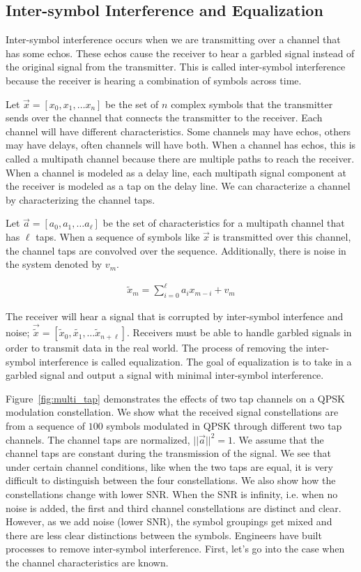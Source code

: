 \subsection{Inter-symbol Interference and Equalization}

Inter-symbol interference occurs when we are transmitting over a channel that has some echos.  These echos cause the receiver to hear a garbled signal instead of the original signal from the transmitter.  This is called inter-symbol interference because the receiver is hearing a combination of symbols across time. 

Let $\vec{x}=[x_0, x_1, \ldots x_n]$ be the set of $n$ complex symbols that the transmitter sends over the channel that connects the transmitter to the receiver.
Each channel will have different characteristics. Some channels may have echos, others may have delays, often channels will have both.  When a channel has echos, this is called a multipath channel because there are multiple paths to reach the receiver.  
When a channel is modeled as a delay line, each multipath signal component at the receiver is modeled as a tap on the delay line.  
We can characterize a channel by characterizing the channel taps.

Let $\vec{a} = [a_0, a_1, \ldots a_{\ell}]$ be the set of characteristics for a multipath channel that has $\ell$ taps. When a sequence of symbols like $\vec{x}$ is transmitted over this channel, the channel taps are convolved over the sequence.  Additionally, there is noise in the system denoted by $v_m$. 

\begin{align}
\tilde{x}_m = \sum_{i=0}^{\ell} a_i x_{m-i} + v_m
\end{align}

The receiver will hear a signal that is corrupted by inter-symbol interfence and noise;
$\vec{\tilde{x}}=[\tilde{x}_0, \tilde{x_1}, \ldots \tilde{x}_{n+\ell}]$. 
Receivers must be able to handle garbled signals in order to transmit data in the real world.  The process of removing the inter-symbol interference is called equalization.  The goal of equalization is to take in a garbled signal and output a signal with minimal inter-symbol interference. 

Figure~\ref{fig:multi_tap} demonstrates the effects of two tap channels on a QPSK modulation constellation.  
We show what the received signal constellations are from a sequence of $100$ symbols modulated in QPSK through different two tap channels.  The channel taps are normalized, $||\vec{a}||^2=1$.  We assume that the channel taps are constant during the transmission of the signal.
We see that under certain channel conditions, like when the two taps are equal, it is very difficult to distinguish between the four constellations.  
We also show how the constellations change with lower SNR.  When the SNR is infinity, i.e. when no noise is added, the first and third channel constellations are distinct and clear.  However, as we add noise (lower SNR), the symbol groupings get mixed and there are less clear distinctions between the symbols.
Engineers have built processes to remove inter-symbol interference.  First, let's go into the case when the channel characteristics are known.

